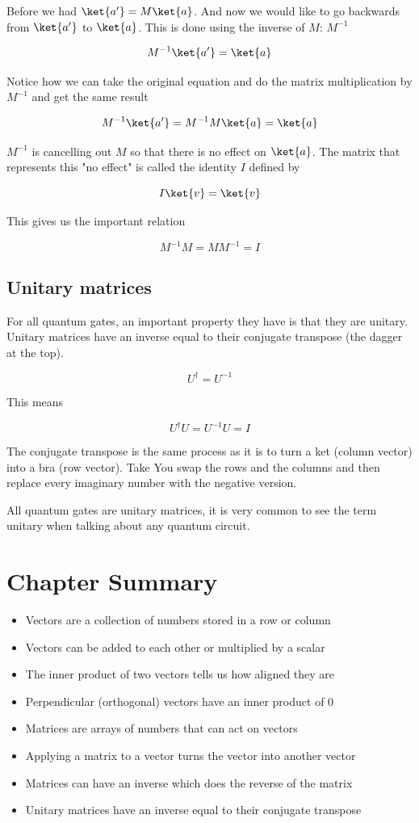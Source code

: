 \documentclass{book}
\begin{document}
Before we had $\ket{a'} = M\ket{a}$. And now we would like to go backwards from $\ket{a'}$ to $\ket{a}$. This is done using the inverse of $M$: $M^{-1}$

$$
 M^{-1}\ket{a'} = \ket{a} 
$$

Notice how we can take the original equation and do the matrix multiplication by $M^{-1}$ and get the same result

$$
M^{-1}\ket{a'} = M^{-1}M\ket{a} = \ket{a}
$$

$M^{-1}$ is cancelling out $M$ so that there is no effect on $\ket{a}$. The matrix that represents this "no effect" is called the identity $I$ defined by 


$$ I\ket{v} = \ket{v}$$

This gives us the important relation 


$$ M^{-1}M = MM^{-1} = I $$

\subsection{ Unitary matrices} 

For all quantum gates, an important property they have is that they are unitary. Unitary matrices have an inverse equal to their conjugate transpose (the dagger at the top).

$$ U^\dagger = U^{-1} $$

This means 

$$ U^\dagger U = U^{-1}U = I $$

The conjugate transpose is the same process as it is to turn a ket (column vector) into a bra (row vector). Take You swap the rows and the columns and then replace every imaginary number with the negative version. 

All quantum gates are unitary matrices, it is very common to see the term unitary when talking about any quantum circuit. 


\section{Chapter Summary }
\begin{itemize} 
    \item Vectors are a collection of numbers stored in a row or column
    \item Vectors can be added to each other or multiplied by a scalar
    \item The inner product of two vectors tells us how aligned they are
    \item  Perpendicular (orthogonal) vectors have an inner product of 0
    \item  Matrices are arrays of numbers that can act on vectors 
    \item  Applying a matrix to a vector turns the vector into another vector
    \item  Matrices can have an inverse which does the reverse of the matrix 
    \item  Unitary matrices have an inverse equal to their conjugate transpose
\end{itemize}
\end{document}
